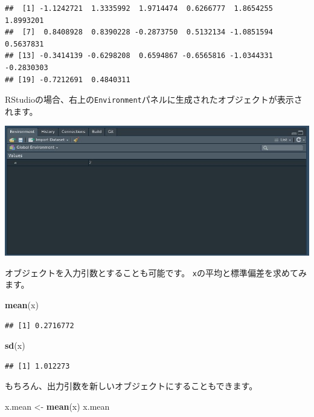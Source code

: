 \documentclass[]{bxjsreport}
\newenvironment{Shaded}{\begin{snugshade}}{\end{snugshade}}
\newcommand{\KeywordTok}[1]{\textcolor[rgb]{0.13,0.29,0.53}{\textbf{#1}}}
\newcommand{\NormalTok}[1]{#1}
\newcommand{\StringTok}[1]{\textcolor[rgb]{0.31,0.60,0.02}{#1}}
\begin{document}
\begin{verbatim}
##  [1] -1.1242721  1.3335992  1.9714474  0.6266777  1.8654255  1.8993201
##  [7]  0.8408928  0.8390228 -0.2873750  0.5132134 -1.0851594  0.5637831
## [13] -0.3414139 -0.6298208  0.6594867 -0.6565816 -1.0344331 -0.2830303
## [19] -0.7212691  0.4840311
\end{verbatim}

RStudioの場合、右上の\texttt{Environment}パネルに生成されたオブジェクトが表示されます。

\includegraphics{figures/intro_r1.jpg}

オブジェクトを入力引数とすることも可能です。
\texttt{x}の平均と標準偏差を求めてみます。

\begin{Shaded}
\begin{Highlighting}[]
\KeywordTok{mean}\NormalTok{(x)}
\end{Highlighting}
\end{Shaded}

\begin{verbatim}
## [1] 0.2716772
\end{verbatim}

\begin{Shaded}
\begin{Highlighting}[]
\KeywordTok{sd}\NormalTok{(x)}
\end{Highlighting}
\end{Shaded}

\begin{verbatim}
## [1] 1.012273
\end{verbatim}

もちろん、出力引数を新しいオブジェクトにすることもできます。

\begin{Shaded}
\begin{Highlighting}[]
\NormalTok{x.mean <-}\StringTok{ }\KeywordTok{mean}\NormalTok{(x)}
\NormalTok{x.mean}
\end{Highlighting}
\end{Shaded}
\end{document}
